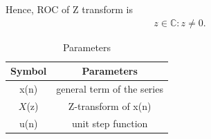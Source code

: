 \documentclass[journal,12pt,twocolumn]{IEEEtran}
\begin{document}
Hence, ROC of Z transform is 
\begin{align}
	z\in\mathbb{C} : z \neq 0.
\end{align}
\begin{table}[h]
  \centering
  \begin{tabular}{|c|c|}
    \hline
    	\textbf{Symbol} & \textbf{Parameters} \\
    \hline
	  x(n) & general term of the series \\
    \hline
	  $X$(z) & Z-transform of x(n) \\
    \hline 
	  u(n) & unit step function \\
    \hline

  \end{tabular}
  \vspace{0.3cm}
  \caption{Parameters}
  \label{tab:parameters}
\end{table}
\end{document}
